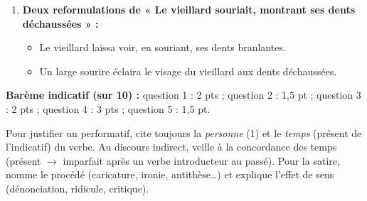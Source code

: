 \documentclass[11pt]{article}
\begin{document}
\begin{corrige}
\begin{enumerate}
\item \textbf{Deux reformulations de « Le vieillard souriait, montrant ses dents déchaussées » :}
\begin{itemize}
\item Le vieillard laissa voir, en souriant, ses dents branlantes.
\item Un large sourire éclaira le visage du vieillard aux dents déchaussées.
\end{itemize}
\end{enumerate}
\textbf{Barème indicatif (sur 10) :} question 1 : 2 pts ; question 2 : 1,5 pt ; question 3 : 2 pts ; question 4 : 3 pts ; question 5 : 1,5 pt.
\end{corrige}

\begin{attention}
Pour justifier un performatif, cite toujours la \emph{personne} (1\iere) et le \emph{temps} (présent de l'indicatif) du verbe. Au discours indirect, veille à la concordance des temps (présent $\rightarrow$ imparfait après un verbe introducteur au passé). Pour la satire, nomme le procédé (caricature, ironie, antithèse\ldots) et explique l'effet de sens (dénonciation, ridicule, critique).
\end{attention}
\end{document}
